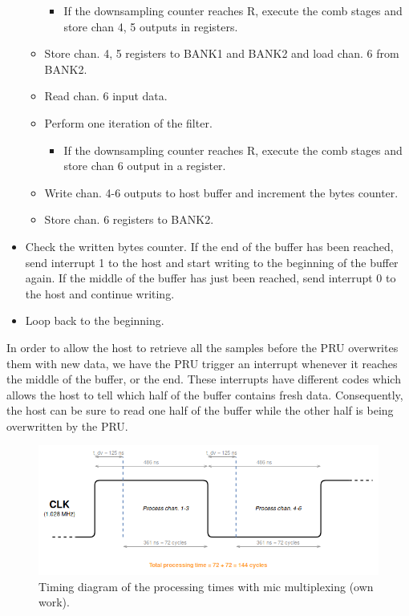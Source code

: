 \documentclass[]{report}
\providecommand{\tightlist}{%
	\setlength{\itemsep}{0pt}\setlength{\parskip}{0pt}}
\begin{document}
\begin{itemize}
\begin{itemize}
    \begin{itemize}
    \tightlist
    \item
      If the downsampling counter reaches R, execute the comb stages and
      store chan 4, 5 outputs in registers.
    \end{itemize}
  \item
    Store chan. 4, 5 registers to BANK1 and BANK2 and load chan. 6 from
    BANK2.
  \item
    Read chan. 6 input data.
  \item
    Perform one iteration of the filter.

    \begin{itemize}
    \tightlist
    \item
      If the downsampling counter reaches R, execute the comb stages and
      store chan 6 output in a register.
    \end{itemize}
  \item
    Write chan. 4-6 outputs to host buffer and increment the bytes counter.
  \item
    Store chan. 6 registers to BANK2.
  \end{itemize}
\item
  Check the written bytes counter. If the end of the buffer has been
  reached, send interrupt 1 to the host and start writing to the
  beginning of the buffer again. If the middle of the buffer has just
  been reached, send interrupt 0 to the host and continue writing.
\item
  Loop back to the beginning.
\end{itemize}

In order to allow the host to retrieve all the samples before the PRU overwrites them with new data, we have the PRU trigger an interrupt whenever it reaches the middle of the buffer, or the end. These interrupts have different codes which allows the host to tell which half of the buffer contains fresh data. Consequently, the host can be sure to read one half of the buffer while the other half is being overwritten by the PRU.

\begin{figure}[H]
\centering
\includegraphics[width=1.0\linewidth]{Pictures/PRU_timing_diagram_mic_multiplexing.png}
\caption{Timing diagram of the processing times with mic multiplexing (own work).}
\label{fig:multiplex-mics}
\end{figure}
\end{document}
